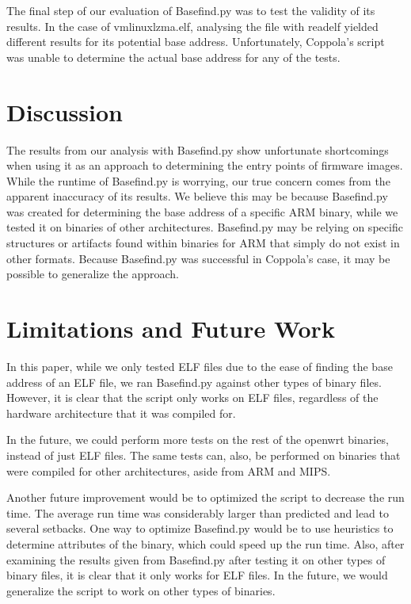 \documentclass[letterpaper,twocolumn,10pt]{article}
\begin{document}
The final step of our evaluation of Basefind.py was to test the validity of its results. In the case of vmlinuxlzma.elf, analysing the file with readelf yielded different results for its potential base address. Unfortunately, Coppola's script was unable to determine the actual base address for any of the tests. 

\section{Discussion}
The results from our analysis with Basefind.py show unfortunate shortcomings when using it as an approach to determining the entry points of firmware images. While the runtime of Basefind.py is worrying, our true concern comes from the apparent inaccuracy of its results. We believe this may be because Basefind.py was created for determining the base address of a specific ARM binary, while we tested it on binaries of other architectures. Basefind.py may be relying on specific structures or artifacts found within binaries for ARM that simply do not exist in other formats. Because Basefind.py was successful in Coppola's case, it may be possible to generalize the approach.

\section{Limitations and Future Work}
In this paper, while we only tested ELF files due to the ease of finding the base address of an ELF file, we ran Basefind.py against other types of binary files. However, it is clear that the script only works on ELF files, regardless of the hardware architecture that it was compiled for. 

In the future, we could perform more tests on the rest of the openwrt binaries, instead of just ELF files. The same tests can, also, be performed on binaries that were compiled for other architectures, aside from ARM and MIPS. 

Another future improvement would be to optimized the script to decrease the run time. The average run time was considerably larger than predicted and lead to several setbacks. One way to optimize Basefind.py would be to use heuristics to determine attributes of the binary, which could speed up the run time. Also, after examining the results given from Basefind.py after testing it on other types of binary files, it is clear that it only works for ELF files. In the future, we would generalize the script to work on other types of binaries. 
\end{document}
